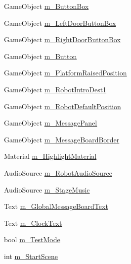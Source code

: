 \begin{DoxyCompactItemize}
\item 
Game\+Object \mbox{\hyperlink{class_intro_session_manager_ab9bab6c380a3dcc60825a13fffd65414}{m\+\_\+\+Button\+Box}}
\item 
Game\+Object \mbox{\hyperlink{class_intro_session_manager_ac1ebde5d641b0fbe3f5c7d5f466406c4}{m\+\_\+\+Left\+Door\+Button\+Box}}
\item 
Game\+Object \mbox{\hyperlink{class_intro_session_manager_a156fbcdf5bd354b60a3a864e63149d74}{m\+\_\+\+Right\+Door\+Button\+Box}}
\item 
Game\+Object \mbox{\hyperlink{class_intro_session_manager_af373a8e1add9dccca5985f10db4c3c13}{m\+\_\+\+Button}}
\item 
Game\+Object \mbox{\hyperlink{class_intro_session_manager_ac7c8eb1a21d3cf81c759c6088e02fac5}{m\+\_\+\+Platform\+Raised\+Position}}
\item 
Game\+Object \mbox{\hyperlink{class_intro_session_manager_a0c8ac69af055d55bef22944606a0232d}{m\+\_\+\+Robot\+Intro\+Dest1}}
\item 
Game\+Object \mbox{\hyperlink{class_intro_session_manager_ab609b1106ef0b8526612fc511bf711f3}{m\+\_\+\+Robot\+Default\+Position}}
\item 
Game\+Object \mbox{\hyperlink{class_intro_session_manager_a0de05def8a32179bbea80d1d4a296829}{m\+\_\+\+Message\+Panel}}
\item 
Game\+Object \mbox{\hyperlink{class_intro_session_manager_a1a92991967b5d8f322610a85a548d4df}{m\+\_\+\+Message\+Board\+Border}}
\item 
Material \mbox{\hyperlink{class_intro_session_manager_a74a01ae10424770fa43f60f407cf2cf1}{m\+\_\+\+Highlight\+Material}}
\item 
Audio\+Source \mbox{\hyperlink{class_intro_session_manager_a184d9e4647fb9b54d6292971c0d36590}{m\+\_\+\+Robot\+Audio\+Source}}
\item 
Audio\+Source \mbox{\hyperlink{class_intro_session_manager_af435af1ecc0838851211ff54a82c750b}{m\+\_\+\+Stage\+Music}}
\item 
Text \mbox{\hyperlink{class_intro_session_manager_ace9b36a18f2d4f140836a98827011cef}{m\+\_\+\+Global\+Message\+Board\+Text}}
\item 
Text \mbox{\hyperlink{class_intro_session_manager_affe78d60003972c8f0dc9e9e1e63e50e}{m\+\_\+\+Clock\+Text}}
\item 
bool \mbox{\hyperlink{class_intro_session_manager_a4f6bbbe92b466fc9713ea809e44b8715}{m\+\_\+\+Test\+Mode}}
\item 
int \mbox{\hyperlink{class_intro_session_manager_aaeefdeac17668edbd7638eea2c771c5f}{m\+\_\+\+Start\+Scene}}

\end{DoxyCompactItemize}
